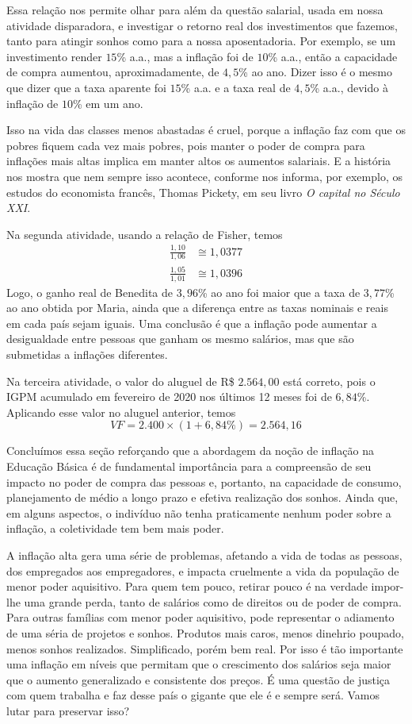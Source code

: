 Essa relação nos permite olhar para além da questão salarial, usada em nossa atividade disparadora, e investigar o retorno real dos investimentos que fazemos, tanto para atingir sonhos como para a nossa aposentadoria. Por exemplo, se um investimento render $15$\% a.a., mas a inflação foi de $10$\% a.a., então a capacidade de compra aumentou, aproximadamente, de $4{,}5$\% ao ano. Dizer isso é o mesmo que dizer que a taxa aparente foi $15$\% a.a. e a taxa real de $4{,}5$\% a.a., devido à inflação de $10$\% em um ano.

Isso na vida das classes menos abastadas é cruel, porque a inflação faz com que os pobres fiquem cada vez mais pobres, pois manter o poder de compra para inflações mais altas implica em manter altos os aumentos salariais. E a história nos mostra que nem sempre isso acontece, conforme nos informa, por exemplo, os estudos do economista francês, Thomas Pickety, em seu livro \textit{O capital no Século XXI}.

Na segunda atividade, usando a relação de Fisher, temos
\begin{align*}
\frac{1{,}10}{1{,}06}&\cong1{,}0377\\
\frac{1{,}05}{1{,}01}&\cong1{,}0396
\end{align*}
Logo, o ganho real de Benedita de $3{,}96$\% ao ano foi maior que a taxa de $3{,}77$\% ao ano obtida por Maria, ainda que a diferença entre as taxas nominais e reais em cada país sejam iguais. Uma conclusão é que a inflação pode aumentar a desigualdade entre pessoas que ganham os mesmo salários, mas que são submetidas a inflações diferentes.

Na terceira atividade, o valor do aluguel de R\$ $2.564{,}00$ está correto, pois o IGPM acumulado em fevereiro de 2020 nos últimos 12 meses foi de $6,84$\%. Aplicando esse valor no aluguel anterior, temos
\begin{equation*}
VF=2.400\times(1+6{,}84\%)=2.564{,}16
\end{equation*}

Concluímos essa seção reforçando que a abordagem da noção de inflação na Educação Básica é de fundamental importância para a compreensão de seu impacto no poder de compra das pessoas e, portanto, na capacidade de consumo, planejamento de médio a longo prazo e efetiva realização dos sonhos. Ainda que, em alguns aspectos, o indivíduo não tenha praticamente nenhum poder sobre a inflação, a coletividade tem bem mais poder.

A inflação alta gera uma série de problemas, afetando a vida de todas as pessoas, dos empregados aos empregadores, e impacta cruelmente a vida da população de menor poder aquisitivo. Para quem tem pouco, retirar pouco é na verdade impor-lhe uma grande perda, tanto de salários como de direitos ou de poder de compra. Para outras famílias com menor poder aquisitivo, pode representar o adiamento de uma séria de projetos e sonhos. Produtos mais caros, menos dinehrio poupado, menos sonhos realizados. Simplificado, porém bem real. Por isso é tão importante uma inflação em níveis que permitam que o crescimento dos salários seja maior que o aumento generalizado e consistente dos preços. É uma questão de justiça com quem trabalha e faz desse país o gigante que ele é e sempre será. Vamos lutar para preservar isso?

